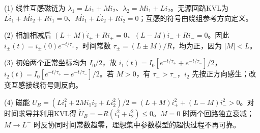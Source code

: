 (1) 线性互感磁链为 \(\lambda_1=Li_1+Mi_2\)、\(\lambda_2=Mi_1+Li_2\)。无源回路KVL为 \(L\dot i_1+M\dot i_2+Ri_1=0\)、\(M\dot i_1+L\dot i_2+Ri_2=0\)；互感的符号由绕组参考方向定义。

(2) 相加相减后 \((L+M)\dot i_++Ri_+=0\)、\((L-M)\dot i_-+Ri_-=0\)。因此 \(i_\pm(t)=i_\pm(0)e^{-t/\tau_\pm}\)，时间常数 \(\boxed{\tau_\pm=(L\pm M)/R}\)，均为正，因为 \(|M|<L\)。

(3) 初始两个正常坐标均为 \(I_0/2\)，故 \(i_1(t)=I_0[e^{-t/\tau_+}+e^{-t/\tau_-}]/2\)，\(i_2(t)=I_0[e^{-t/\tau_+}-e^{-t/\tau_-}]/2\)。若 \(M>0\)，有 \(\tau_+>\tau_-\)，\(i_2\) 先按正方向感生；改变互感接线符号则反向。

(4) 磁能 \(U_B=(Li_1^2+2Mi_1i_2+Li_2^2)/2=(L+M)i_+^2+(L-M)i_-^2>0\)。对时间求导并利用KVL得 \(\dot U_B=-R(i_1^2+i_2^2)\le0\)。\(M=0\) 时两个回路独立衰减；\(M\to L^-\) 时反协同时间常数趋零，理想集中参数模型的超快过程不再可靠。
